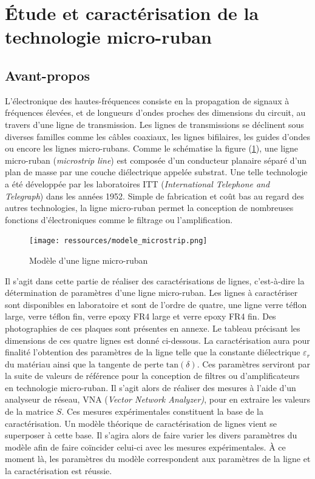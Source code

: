 \documentclass[french]{article}
\begin{document}
\newpage

\section{Étude et caractérisation de la technologie micro-ruban}

\subsection{Avant-propos}

L'électronique des hautes-fréquences consiste en la propagation de signaux à fréquences élevées, et de longueurs d'ondes proches des dimensions du circuit, au travers d'une ligne de transmission. Les lignes de transmissions se déclinent sous diverses familles comme les câbles coaxiaux, les lignes bifilaires, les guides d'ondes ou encore les lignes micro-rubans. Comme le schématise la figure (\ref{fig:modele_microstrip}), une ligne micro-ruban (\textit{microstrip line}) est composée d'un conducteur planaire séparé d'un plan de masse par une couche diélectrique appelée substrat. Une telle technologie a été développée par les laboratoires ITT (\textit{International Telephone and Telegraph}) dans les années 1952. Simple de fabrication et coût bas au regard des autres technologies, la ligne micro-ruban permet la conception de nombreuses fonctions d'électroniques comme le filtrage ou l'amplification.

\begin{figure}[H]
	\centering
	\texttt{[image: ressources/modele\_microstrip.png]}
	\caption{Modèle d'une ligne micro-ruban}
	\label{fig:modele_microstrip}
\end{figure}

Il s'agit dans cette partie de réaliser des caractérisations de lignes, c'est-à-dire la détermination de paramètres d'une ligne micro-ruban. Les lignes à caractériser sont disponibles en laboratoire et sont de l'ordre de quatre, une ligne verre téflon large, verre téflon fin, verre epoxy FR4 large et verre epoxy FR4 fin. Des photographies de ces plaques sont présentes en annexe. Le tableau précisant les dimensions de ces quatre lignes est donné ci-dessous. La caractérisation aura pour finalité l'obtention des paramètres de la ligne telle que la constante diélectrique $\varepsilon_r$ du matériau ainsi que la tangente de perte $\mbox{tan}(\delta)$. Ces paramètres serviront par la suite de valeurs de référence pour la conception de filtres ou d'amplificateurs en technologie micro-ruban. Il s'agit alors de réaliser des mesures à l'aide d'un analyseur de réseau, VNA (\textit{Vector Network Analyzer)}, pour en extraire les valeurs de la matrice $S$. Ces mesures expérimentales constituent la base de la caractérisation. Un modèle théorique de caractérisation de lignes vient se superposer à cette base. Il s'agira alors de faire varier les divers paramètres du modèle afin de faire coïncider celui-ci avec les mesures expérimentales. À ce moment là, les paramètres du modèle correspondent aux paramètres de la ligne et la caractérisation est réussie.
\end{document}
